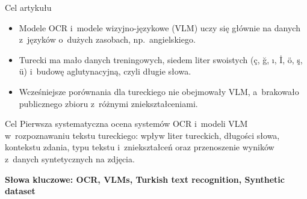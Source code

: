 \documentclass[aspectratio=169,11pt]{beamer}
\begin{document}
\begin{frame}{Cel artykułu}
  \begin{itemize}
    \item Modele OCR i~modele wizyjno-językowe (VLM) uczy się głównie na danych z~języków o~dużych zasobach, np.~angielskiego.
    \item Turecki ma mało danych treningowych, siedem liter swoistych (ç, ğ, ı, İ, ö, ş, ü) i~budowę aglutynacyjną, czyli długie słowa.
    \item Wcześniejsze porównania dla tureckiego nie obejmowały VLM, a~brakowało publicznego zbioru z~różnymi zniekształceniami.
  \end{itemize}
  \begin{block}{Cel}
    Pierwsza systematyczna ocena systemów OCR i~modeli VLM w~rozpoznawaniu tekstu tureckiego: wpływ liter tureckich,
    długości słowa, kontekstu zdania, typu tekstu i~zniekształceń oraz przenoszenie wyników z~danych syntetycznych
    na zdjęcia.
  \end{block}
  \medskip
  {\normalsize \textbf{Słowa kluczowe: OCR, VLMs, Turkish text recognition, Synthetic dataset}}
\end{frame}
\end{document}
